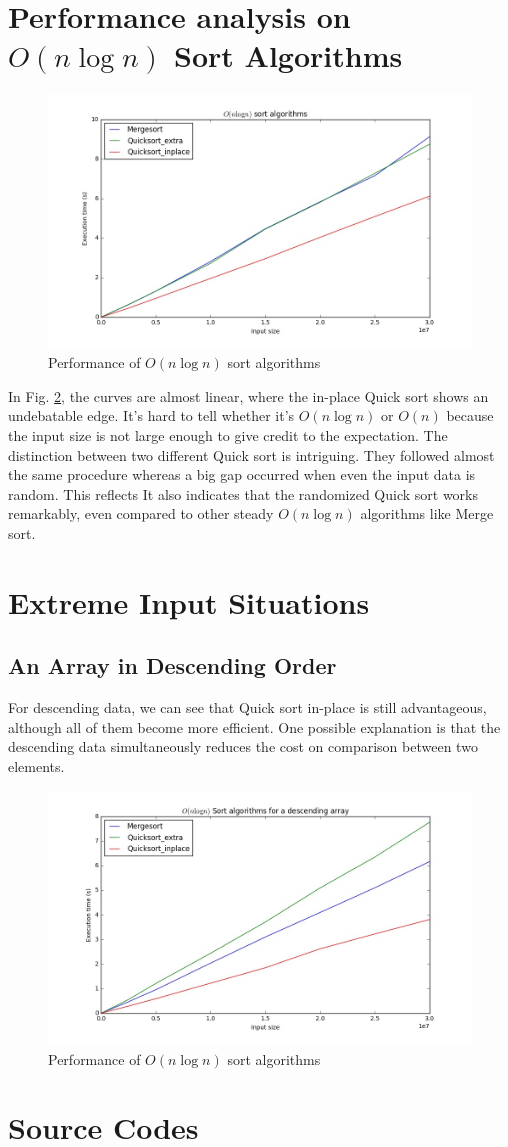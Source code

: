 \section{Performance analysis on $O(n\log n)$ Sort Algorithms}
\begin{figure}[H]
    \centering
    \includegraphics[width=0.8\linewidth]{../a1/345}
    \caption{Performance of $O(n\log n)$ sort algorithms}\label{345}
\end{figure}
In Fig. \ref{345}, the curves are almost linear, where the in-place Quick sort shows an undebatable edge. It's hard to tell whether it's $O(n\log n)$ or $O(n)$ because the input size is not large enough to give credit to the expectation. The distinction between two different Quick sort is intriguing. They followed almost the same procedure whereas a big gap occurred when even the input data is random. This reflects It also indicates that the randomized Quick sort works remarkably, even compared to other steady $O(n\log n)$ algorithms like Merge sort.

\section{Extreme Input Situations}
\subsection{An Array in Descending Order}
For descending data, we can see that Quick sort in-place is still advantageous, although all of them become more efficient. One possible explanation is that the descending data simultaneously reduces the cost on comparison between two elements. 
\begin{figure}[H]
    \centering
    \includegraphics[width=0.8\linewidth]{../a1/reverse}
    \caption{Performance of $O(n\log n)$ sort algorithms}\label{345}
\end{figure}

\appendix
\section{Source Codes}
